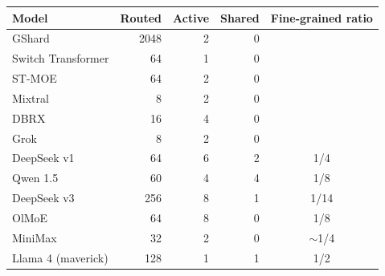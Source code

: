 \begin{center}
\footnotesize
\renewcommand{\arraystretch}{0.92}
\begin{tabular}{@{}lrrrc@{}}
\toprule
\textbf{Model} & \textbf{Routed} & \textbf{Active} & \textbf{Shared} & \textbf{Fine-grained ratio}\\
\midrule
GShard & 2048 & 2 & 0 & \\
Switch Transformer & 64 & 1 & 0 & \\
ST-MOE & 64 & 2 & 0 & \\
Mixtral & 8 & 2 & 0 & \\
DBRX & 16 & 4 & 0 & \\
Grok & 8 & 2 & 0 & \\
DeepSeek v1 & 64 & 6 & 2 & 1/4\\
Qwen 1.5 & 60 & 4 & 4 & 1/8\\\midrule
DeepSeek v3 & 256 & 8 & 1 & 1/14\\
OlMoE & 64 & 8 & 0 & 1/8\\
MiniMax & 32 & 2 & 0 & $\sim$1/4\\
Llama 4 (maverick) & 128 & 1 & 1 & 1/2\\
\bottomrule
\end{tabular}
\end{center}
